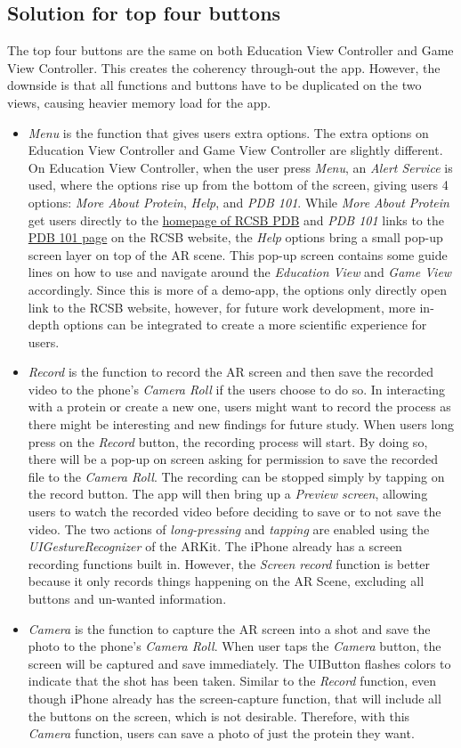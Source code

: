 \subsection{Solution for top four buttons}
The top four buttons are the same on both Education View Controller and Game View Controller. This creates the coherency through-out the app. However, the downside is that all functions and buttons have to be duplicated on the two views, causing heavier memory load for the app. 
\begin{itemize}
	\item \emph{Menu} is the function that gives users extra options. The extra options on Education View Controller and Game View Controller are slightly different. On Education View Controller, when the user press \emph{Menu}, an \emph{Alert Service} is used, where the options rise up from the bottom of the screen, giving users 4 options: \emph{More About Protein}, \emph{Help}, and \emph{PDB 101}. While \emph{More About Protein} get users directly to the \href{http://rcsb.org}{homepage of RCSB PDB} and \emph{PDB 101} links to the \href{http://pdb101.rcsb.org}{PDB 101 page} on the RCSB website, the \emph{Help} options bring a small pop-up screen layer on top of the AR scene. This pop-up screen contains some guide lines on how to use and navigate around the \emph{Education View} and \emph{Game View} accordingly. 
Since this is more of a demo-app, the options only directly open link to the RCSB website, however, for future work development, more in-depth options can be integrated to create a more scientific experience for users. 
	\item \emph{Record} is the function to record the AR screen and then save the recorded video to the phone’s \emph{Camera Roll} if the users choose to do so. In interacting with a protein or create a new one, users might want to record the process as there might be interesting and new findings for future study. When users long press on the \emph{Record} button, the recording process will start. By doing so, there will be a pop-up on screen asking for permission to save the recorded file to the \emph{Camera Roll}. The recording can be stopped simply by tapping on the record button. The app will then bring up a \emph{Preview screen}, allowing users to watch the recorded video before deciding to save or to not save the video. The two actions of \emph{long-pressing} and \emph{tapping} are enabled using the \emph{UIGestureRecognizer} of the ARKit. The iPhone already has a screen recording functions built in. However, the \emph{Screen record} function is better because it only records things happening on the AR Scene, excluding all buttons and un-wanted information.
	\item \emph{Camera} is the function to capture the AR screen into a shot and save the photo to the phone’s \emph{Camera Roll}. When user taps the \emph{Camera} button, the screen will be captured and save immediately. The UIButton flashes colors to indicate that the shot has been taken. Similar to the \emph{Record} function, even though iPhone already has the screen-capture function, that will include all the buttons on the screen, which is not desirable. Therefore, with this \emph{Camera} function, users can save a photo of just the protein they want. 


\end{itemize}

